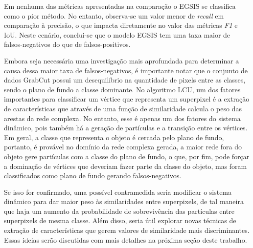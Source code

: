 Em nenhuma das métricas apresentadas na comparação o EGSIS se
classifica como o pior método. No entanto, observa-se um valor menor
de \textit{recall} em comparação à precisão, o que impacta diretamente
no valor das métricas \textit{F1} e IoU. Neste cenário, conclui-se que
o modelo EGSIS tem uma taxa maior de falsos-negativos do que de
falsos-positivos.

Embora seja necessária uma investigação mais aprofundada para
determinar a causa dessa maior taxa de falsos-negativos, é importante
notar que o conjunto de dados GrabCut possui um desequilíbrio na
quantidade de pixels entre as classes, sendo o plano de fundo a classe
dominante. No algoritmo \gls{LCU}, um dos fatores importantes para
classificar um vértice que representa um superpixel é a extração de
características que através de uma função de similaridade calcula o
peso das arestas da rede complexa. No entanto, esse é apenas um dos
fatores do sistema dinâmico, pois também há a geração de partículas e a
transição entre os vértices. Em geral, a classe que representa o
objeto é cercada pelo plano de fundo, portanto, é provável no domínio
da rede complexa gerada, a maior rede fora do objeto gere partículas
com a classe do plano de fundo, o que, por fim, pode forçar a
dominação de vértices que deveriam fazer parte da classe do objeto, mas
foram classificados como plano de fundo gerando falsos-negativos.

Se isso for confirmado, uma possível contramedida seria modificar o
sistema dinâmico para dar maior peso às similaridades entre
superpixels, de tal maneira que haja um aumento da probabilidade
de sobrevivência das partículas entre superpixels de mesma
classe. Além disso, seria útil explorar novas técnicas de extração de
características que gerem valores de similaridade mais
discriminantes. Essas ideias serão discutidas com mais detalhes na
próxima seção deste trabalho.
